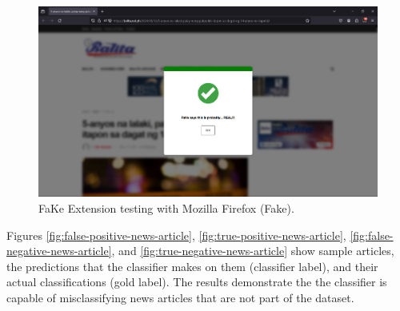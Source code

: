         \begin{figure}[h!]
            \centering
            \includegraphics[width=1\textwidth,height=1\textheight, keepaspectratio]{figures/Screenshots/firefox-true-negative.png}
            \caption{FaKe Extension testing with Mozilla Firefox (Fake).}
            \label{fig:fake-firefox-test}
        \end{figure}

        Figures \ref{fig:false-positive-news-article}, \ref{fig:true-positive-news-article}, \ref{fig:false-negative-news-article}, and \ref{fig:true-negative-news-article} show sample articles, the predictions that the classifier makes on them (classifier label), and their actual classifications (gold label). The results demonstrate the the classifier is capable of misclassifying news articles that are not part of the dataset.

